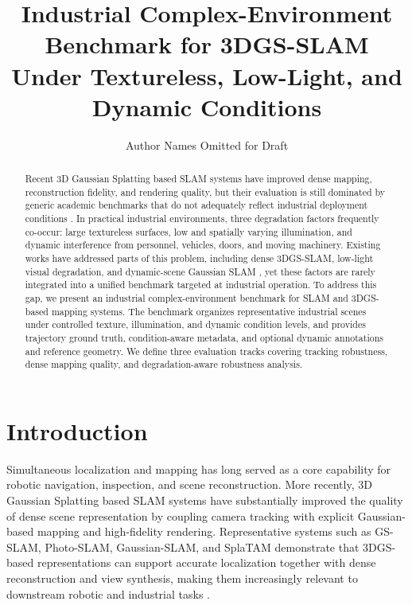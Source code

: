 \documentclass[10pt,twocolumn]{article}
\title{Industrial Complex-Environment Benchmark for 3DGS-SLAM Under Textureless, Low-Light, and Dynamic Conditions}
\author{Author Names Omitted for Draft}
\date{}
\begin{document}
\maketitle

\begin{abstract}
Recent 3D Gaussian Splatting based SLAM systems have improved dense mapping, reconstruction fidelity, and rendering quality, but their evaluation is still dominated by generic academic benchmarks that do not adequately reflect industrial deployment conditions \cite{GSSLAM2024,PhotoSLAM2024,GaussianSLAM2024,SplaTAM2024}. In practical industrial environments, three degradation factors frequently co-occur: large textureless surfaces, low and spatially varying illumination, and dynamic interference from personnel, vehicles, doors, and moving machinery. Existing works have addressed parts of this problem, including dense 3DGS-SLAM, low-light visual degradation, and dynamic-scene Gaussian SLAM \cite{LLGaussianMap2024,DynaGSLAM2024,WildGSSLAM2024}, yet these factors are rarely integrated into a unified benchmark targeted at industrial operation. To address this gap, we present an industrial complex-environment benchmark for SLAM and 3DGS-based mapping systems. The benchmark organizes representative industrial scenes under controlled texture, illumination, and dynamic condition levels, and provides trajectory ground truth, condition-aware metadata, and optional dynamic annotations and reference geometry. We define three evaluation tracks covering tracking robustness, dense mapping quality, and degradation-aware robustness analysis.
\end{abstract}

\section{Introduction}

Simultaneous localization and mapping has long served as a core capability for robotic navigation, inspection, and scene reconstruction. More recently, 3D Gaussian Splatting based SLAM systems have substantially improved the quality of dense scene representation by coupling camera tracking with explicit Gaussian-based mapping and high-fidelity rendering. Representative systems such as GS-SLAM, Photo-SLAM, Gaussian-SLAM, and SplaTAM demonstrate that 3DGS-based representations can support accurate localization together with dense reconstruction and view synthesis, making them increasingly relevant to downstream robotic and industrial tasks \cite{GSSLAM2024,PhotoSLAM2024,GaussianSLAM2024,SplaTAM2024}.
\end{document}
